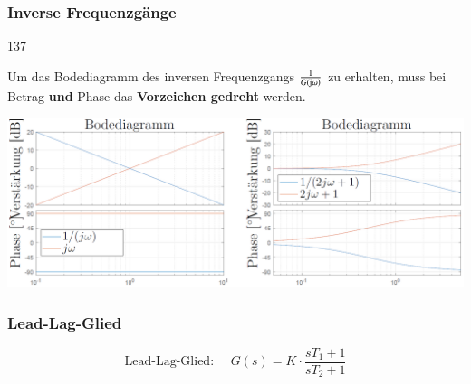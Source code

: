 


\subsubsection{Inverse Frequenzgänge}{137}

Um das Bodediagramm des inversen Frequenzgangs $\frac{1}{G(\mathrm{j} \omega)}$ zu erhalten, muss bei Betrag \textbf{und} Phase
das \textbf{Vorzeichen gedreht} werden.
\vspace{0.2cm}
 
\includegraphics[width=\columnwidth]{images/inverse_frequenzgaenge.png}


\subsubsection{Lead-Lag-Glied}

$$ \boxed{ \text{Lead-Lag-Glied: } \quad G(s) = K \cdot \frac{s T_1 + 1}{s T_2 + 1} } $$

